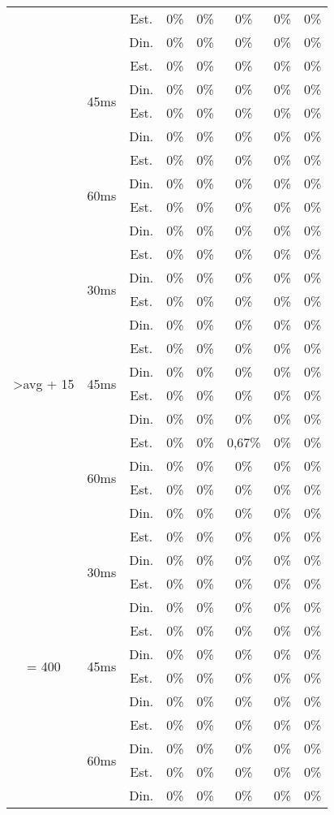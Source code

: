 \begin{center}
\begin{longtable}{|c|c|c|ccccc|}
 &  & Est. &0\% &0\% &0\% &0\% &0\% \\
 &  & Din. &0\% &0\% &0\% &0\% &0\% \\ \cline{2-8} 
 & \multirow{4}{*}{45ms} & Est. &0\% &0\% &0\% &0\% &0\% \\
 &  & Din. &0\% &0\% &0\% &0\% &0\% \\
 &  & Est. &0\% &0\% &0\% &0\% &0\% \\
 &  & Din. &0\% &0\% &0\% &0\% &0\% \\ \cline{2-8} 
 & \multirow{4}{*}{60ms} & Est. &0\% &0\% &0\% &0\% &0\% \\
 &  & Din. &0\% &0\% &0\% &0\% &0\% \\
 &  & Est. &0\% &0\% &0\% &0\% &0\% \\
 &  & Din. &0\% &0\% &0\% &0\% &0\% \\ \hline
\multirow{12}{*}{\textgreater avg + 15} & \multirow{4}{*}{30ms} & Est. &0\% &0\% &0\% &0\% &0\% \\
 &  & Din. &0\% &0\% &0\% &0\% &0\% \\
 &  & Est. &0\% &0\% &0\% &0\% &0\% \\
 &  & Din. &0\% &0\% &0\% &0\% &0\% \\ \cline{2-8} 
 & \multirow{4}{*}{45ms} & Est. &0\% &0\% &0\% &0\% &0\% \\
 &  & Din. &0\% &0\% &0\% &0\% &0\% \\
 &  & Est. &0\% &0\% &0\% &0\% &0\% \\
 &  & Din. &0\% &0\% &0\% &0\% &0\% \\ \cline{2-8} 
 & \multirow{4}{*}{60ms} & Est. &0\% &0\% & 0,67\% &0\% &0\% \\
 &  & Din. &0\% &0\% &0\% &0\% &0\% \\
 &  & Est. &0\% &0\% &0\% &0\% &0\% \\
 &  & Din. &0\% &0\% &0\% &0\% &0\% \\ \hline
\multirow{12}{*}{= 400} & \multirow{4}{*}{30ms} & Est. &0\% &0\% &0\% &0\% &0\% \\
 &  & Din. &0\% &0\% &0\% &0\% &0\% \\
 &  & Est. &0\% &0\% &0\% &0\% &0\% \\
 &  & Din. &0\% &0\% &0\% &0\% &0\% \\ \cline{2-8} 
 & \multirow{4}{*}{45ms} & Est. &0\% &0\% &0\% &0\% &0\% \\
 &  & Din. &0\% &0\% &0\% &0\% &0\% \\
 &  & Est. &0\% &0\% &0\% &0\% &0\% \\
 &  & Din. &0\% &0\% &0\% &0\% &0\% \\ \cline{2-8} 
 & \multirow{4}{*}{60ms} & Est. &0\% &0\% &0\% &0\% &0\% \\
 &  & Din. &0\% &0\% &0\% &0\% &0\% \\
 &  & Est. &0\% &0\% &0\% &0\% &0\% \\
 &  & Din. &0\% &0\% &0\% &0\% &0\% \\ \hline
\end{longtable}
\end{center}
